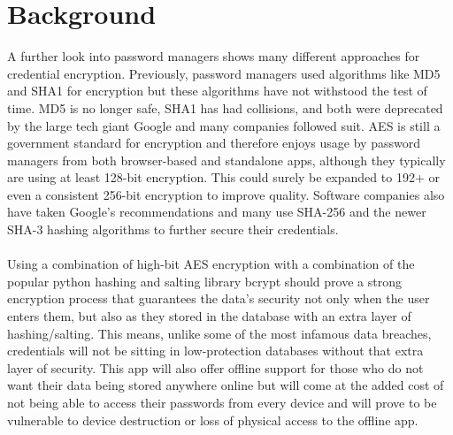 \section{Background}
A further look into password managers shows many different approaches for credential encryption. Previously, password managers used algorithms like MD5 and SHA1 for encryption but these algorithms have not withstood the test of time. MD5 is no longer safe, SHA1 has had collisions, and both were deprecated by the large tech giant Google and many companies followed suit. AES is still a government standard for encryption and therefore enjoys usage by password managers from both browser-based and standalone apps, although they typically are using at least 128-bit encryption. This could surely be expanded to 192+ or even a consistent 256-bit encryption to improve quality. Software companies also have taken Google's recommendations and many use SHA-256 and the newer SHA-3 hashing algorithms to further secure their credentials.\\\\
Using a combination of high-bit AES encryption with a combination of the popular python hashing and salting library bcrypt should prove a strong encryption process that guarantees the data's security not only when the user enters them, but also as they stored in the database with an extra layer of hashing/salting. This means, unlike some of the most infamous data breaches, credentials will not be sitting in low-protection databases without that extra layer of security. This app will also offer offline support for those who do not want their data being stored anywhere online but will come at the added cost of not being able to access their passwords from every device and will prove to be vulnerable to device destruction or loss of physical access to the offline app.

